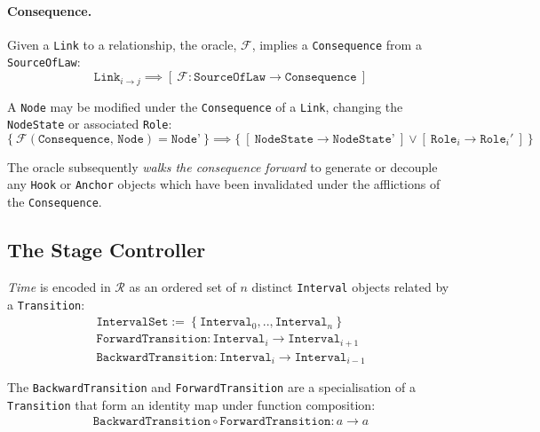 \documentclass{article}
\numberwithin{equation}{section}
\begin{document}
\paragraph{Consequence.} Given a \texttt{Link} to a relationship, the oracle, $\mathcal{F}$, implies a \texttt{Consequence} from a \texttt{SourceOfLaw}:
\begin{equation}
	\texttt{Link}_{i \rightarrow j} \implies [ \ \mathcal{F} : \texttt{SourceOfLaw} \rightarrow \texttt{Consequence} \ ]
\end{equation}

A \texttt{Node} may be modified under the \texttt{Consequence} of a \texttt{Link}, changing the \texttt{NodeState} or associated \texttt{Role}: 
\begin{equation}
	\{ \ \mathcal{F}(\texttt{Consequence, Node}) = \texttt{Node'} \ \} \implies \{ \ [ \ \texttt{NodeState} \rightarrow \texttt{NodeState'} \ ] \lor [ \ \texttt{Role}_i \rightarrow \texttt{Role}_i' \ ] \ \}
\end{equation}

The oracle subsequently \textit{walks the consequence forward} to generate or decouple any \texttt{Hook} or \texttt{Anchor} objects which have been invalidated under the afflictions of the \texttt{Consequence}.



\subsection{The Stage Controller}

\textit{Time} is encoded in $\mathcal{R}$ as an ordered set of $n$ distinct \texttt{Interval} objects related by a \texttt{Transition}:
\begin{align}
	\texttt{IntervalSet} := \ \{ \ \texttt{Interval}_0, .., \texttt{Interval}_n \ \} \\
	\texttt{ForwardTransition} : \texttt{Interval}_i \rightarrow \texttt{Interval}_{i + 1}\\
	\texttt{BackwardTransition} : \texttt{Interval}_i \rightarrow \texttt{Interval}_{i - 1}
\end{align}

The \texttt{BackwardTransition} and \texttt{ForwardTransition} are a specialisation of a \texttt{Transition} that form an identity map under function composition:
\begin{align}
	\texttt{BackwardTransition} \circ \texttt{ForwardTransition} : a \rightarrow a
\end{align}
\end{document}
